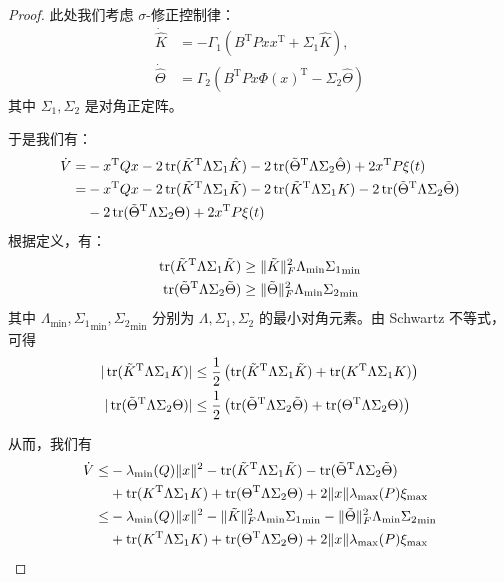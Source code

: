 \begin{proof}
    此处我们考虑 $\sigma$-修正控制律：
    \begin{align*}
        \dot{\hat{K}}&=-\Gamma_1(B^\mathrm{T}Pxx^\mathrm{T}+\Sigma_1\hat{K}), \\ \dot{\hat{\Theta}}&=\Gamma_2(B^\mathrm{T}Px\Phi(x)^\mathrm{T}-\Sigma_2\hat{\Theta})
    \end{align*}
    其中 $\Sigma_1, \Sigma_2$ 是对角正定阵。

    于是我们有：
    \begin{align*}
        \dot{V}=&-x^\mathrm{T}Qx-2\operatorname{tr}(\tilde{K}^\mathrm{T}\Lambda\Sigma_1\hat{K})-2\operatorname{tr}(\tilde{\Theta}^\mathrm{T}\Lambda\Sigma_2\hat{\Theta})+2x^\mathrm{T}P\xi(t)\\
        =&-x^\mathrm{T}Qx-2\operatorname{tr}(\tilde{K}^\mathrm{T}\Lambda\Sigma_1\tilde{K})-2\operatorname{tr}(\tilde{K}^\mathrm{T}\Lambda\Sigma_1 K)-2\operatorname{tr}(\tilde{\Theta}^\mathrm{T}\Lambda\Sigma_2\tilde{\Theta})\\
        &-2\operatorname{tr}(\tilde{\Theta}^\mathrm{T}\Lambda\Sigma_2\Theta)+2x^\mathrm{T}P\xi(t)
    \end{align*}
    根据定义，有：
    \begin{align*}
        \operatorname{tr}(\tilde{K}^\mathrm{T}\Lambda\Sigma_1\tilde{K})&\geq \|\tilde{K}\|_F^2\Lambda_{\mathrm{min}}{\Sigma_1}_{\mathrm{min}} \\
        \operatorname{tr}(\tilde{\Theta}^\mathrm{T}\Lambda\Sigma_2\tilde{\Theta})&\geq \|\tilde{\Theta}\|_F^2\Lambda_{\mathrm{min}}{\Sigma_2}_{\mathrm{min}}
    \end{align*}
    其中 $\Lambda_{\mathrm{min}}, {\Sigma_1}_{\mathrm{min}}, {\Sigma_2}_{\mathrm{min}}$ 分别为 $\Lambda, \Sigma_1, \Sigma_2$ 的最小对角元素。由 Schwartz 不等式，可得
    \begin{align*}
        |\operatorname{tr}(\tilde{K}^\mathrm{T}\Lambda\Sigma_1 K)| &\leq \dfrac{1}{2} \left( \operatorname{tr}(\tilde{K}^\mathrm{T} \Lambda\Sigma_1 \tilde{K}) + \operatorname{tr}(K^\mathrm{T} \Lambda\Sigma_1 K) \right) \\
        |\operatorname{tr}(\tilde{\Theta}^\mathrm{T}\Lambda\Sigma_2 \Theta)| &\leq \dfrac{1}{2} \left( \operatorname{tr}(\tilde{\Theta}^\mathrm{T} \Lambda\Sigma_2 \tilde{\Theta}) + \operatorname{tr}(\Theta^\mathrm{T} \Lambda\Sigma_2 \Theta) \right)
    \end{align*}

    从而，我们有
    \begin{align*}
        \dot{V} \leq & -\lambda_{\min}(Q)\|x\|^2
        -\operatorname{tr}(\tilde{K}^\mathrm{T}\Lambda\Sigma_1\tilde{K})
        -\operatorname{tr}(\tilde{\Theta}^\mathrm{T}\Lambda\Sigma_2\tilde{\Theta})\\
        &+\operatorname{tr}(K^\mathrm{T} \Lambda\Sigma_1 K)+\operatorname{tr}(\Theta^\mathrm{T} \Lambda\Sigma_2 \Theta)+2\|x\|\lambda_{\max}(P)\xi_{\max}\\
        \leq & -\lambda_{\min}(Q)\|x\|^2 - \|\tilde{K}\|_F^2\Lambda_{\mathrm{min}}{\Sigma_1}_{\mathrm{min}} - \|\tilde{\Theta}\|_F^2\Lambda_{\mathrm{min}}{\Sigma_2}_{\mathrm{min}} \\
        &+\operatorname{tr}(K^\mathrm{T} \Lambda\Sigma_1 K)+\operatorname{tr}(\Theta^\mathrm{T} \Lambda\Sigma_2 \Theta)+2\|x\|\lambda_{\max}(P)\xi_{\max}
    \end{align*}


\end{proof}
